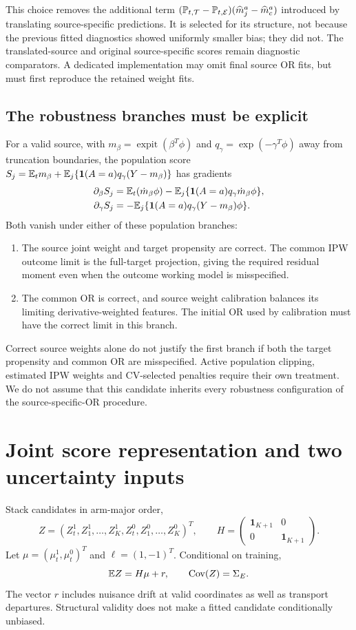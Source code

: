 This choice removes the additional term
$(\mathbb P_{t,\mathcal T}-\mathbb P_{t,\mathcal E})(\widehat m_j^a-\widehat m_c^a)$
introduced by translating source-specific predictions. It is selected for
its structure, not because the previous fitted diagnostics showed uniformly
smaller bias; they did not. The translated-source and original source-specific
scores remain diagnostic comparators. A dedicated implementation may omit
final source OR fits, but must first reproduce the retained weight fits.

\subsection{The robustness branches must be explicit}
For a valid source, with $m_\beta=\operatorname{expit}(\beta^T\phi)$ and
$q_\gamma=\exp(-\gamma^T\phi)$ away from truncation boundaries, the population
score $S_j=\mathbb E_t m_\beta+\mathbb E_j\{\mathbf 1(A=a)q_\gamma(Y-m_\beta)\}$ has gradients
\begin{align*}
 \partial_\beta S_j&=\mathbb E_t(\dot m_\beta\phi)
              -\mathbb E_j\{\mathbf 1(A=a)q_\gamma\dot m_\beta\phi\},\\
 \partial_\gamma S_j&=-\mathbb E_j\{\mathbf 1(A=a)q_\gamma(Y-m_\beta)\phi\}.
\end{align*}
Both vanish under either of these population branches:
\begin{enumerate}
\item The source joint weight and target propensity are correct. The common
IPW outcome limit is the full-target projection, giving the required residual
moment even when the outcome working model is misspecified.
\item The common OR is correct, and source weight calibration balances its
limiting derivative-weighted features. The initial OR used by calibration
must have the correct limit in this branch.
\end{enumerate}
Correct source weights alone do not justify the first branch if both the
target propensity and common OR are misspecified. Active population clipping,
estimated IPW weights and CV-selected penalties require their own treatment.
We do not assume that this candidate inherits every robustness configuration
of the source-specific-OR procedure.

\section{Joint score representation and two uncertainty inputs}

Stack candidates in arm-major order,
\[
 Z=(Z_t^1,Z_1^1,\ldots,Z_K^1,Z_t^0,Z_1^0,\ldots,Z_K^0)^T,
 \qquad H=\begin{pmatrix}\mathbf1_{K+1}&0\\0&\mathbf1_{K+1}\end{pmatrix}.
\]
Let $\mu=(\mu_t^1,\mu_t^0)^T$ and $\ell=(1,-1)^T$. Conditional on training,
\begin{equation}
 \mathbb E Z=H\mu+r,\qquad \operatorname{Cov}(Z)=\Sigma_E.\label{eq:score-model}
\end{equation}
The vector $r$ includes nuisance drift at valid coordinates as well as
transport departures. Structural validity does not make a fitted candidate
conditionally unbiased.

